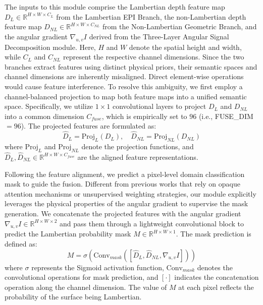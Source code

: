 \documentclass[lettersize,journal]{IEEEtran}
\begin{document}
The inputs to this module comprise the Lambertian depth feature map $D_L \in \mathbb{R}^{H \times W \times C_L}$ from the Lambertian EPI Branch, the non-Lambertian depth feature map $D_{NL} \in \mathbb{R}^{H \times W \times C_{NL}}$ from the Non-Lambertian Geometric Branch, and the angular gradient $\nabla_{u,v} I$ derived from the Three-Layer Angular Signal Decomposition module. Here, $H$ and $W$ denote the spatial height and width, while $C_L$ and $C_{NL}$ represent the respective channel dimensions. Since the two branches extract features using distinct physical priors, their semantic spaces and channel dimensions are inherently misaligned. Direct element-wise operations would cause feature interference. To resolve this ambiguity, we first employ a channel-balanced projection to map both feature maps into a unified semantic space. Specifically, we utilize $1 \times 1$ convolutional layers to project $D_L$ and $D_{NL}$ into a common dimension $C_{fuse}$, which is empirically set to $96$ (i.e., FUSE\_DIM $= 96$). The projected features are formulated as:
\begin{equation}
\hat{D}_L = \text{Proj}_L(D_L), \quad \hat{D}_{NL} = \text{Proj}_{NL}(D_{NL})
\label{eq:ch3_17}
\end{equation}
where $\text{Proj}_L$ and $\text{Proj}_{NL}$ denote the projection functions, and $\hat{D}_L, \hat{D}_{NL} \in \mathbb{R}^{H \times W \times C_{fuse}}$ are the aligned feature representations.

Following the feature alignment, we predict a pixel-level domain classification mask to guide the fusion. Different from previous works \cite{previous_works} that rely on opaque attention mechanisms or unsupervised weighting strategies, our module explicitly leverages the physical properties of the angular gradient to supervise the mask generation. We concatenate the projected features with the angular gradient $\nabla_{u,v} I \in \mathbb{R}^{H \times W \times 2}$ and pass them through a lightweight convolutional block to predict the Lambertian probability mask $M \in \mathbb{R}^{H \times W \times 1}$. The mask prediction is defined as:
\begin{equation}
M = \sigma \left( \text{Conv}_{mask} \left( [\hat{D}_L, \hat{D}_{NL}, \nabla_{u,v} I] \right) \right)
\label{eq:ch3_18}
\end{equation}
where $\sigma$ represents the Sigmoid activation function, $\text{Conv}_{mask}$ denotes the convolutional operations for mask prediction, and $[\cdot]$ indicates the concatenation operation along the channel dimension. The value of $M$ at each pixel reflects the probability of the surface being Lambertian.
\end{document}
